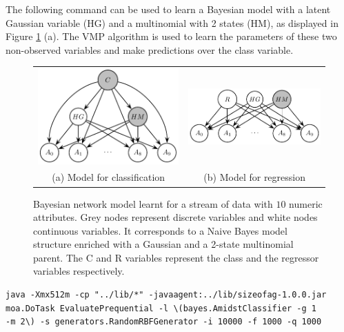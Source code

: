 The following command can be used to learn a Bayesian model with a latent Gaussian variable (HG) and a multinomial with 2 states (HM), as displayed in Figure \ref{fig:HODE} (a). The VMP algorithm is used to learn the parameters of these two non-observed variables and make predictions over the class variable.

\begin{figure}[htb]
   \centering
   \begin{tabular}{cc}
	\includegraphics[scale=0.8]{figs/HODE}&
	\includegraphics[scale=0.8]{figs/regressionHODE}\\
	(a) Model for classification & (b) Model for regression \\
	\end{tabular}
\caption{Bayesian network model learnt for a stream of data with $10$ numeric attributes. Grey nodes represent discrete variables and white nodes continuous variables. It corresponds to a Naive Bayes model structure enriched with a Gaussian and a 2-state multinomial parent. The C and R variables represent the class and the regressor variables respectively.}
\label{fig:HODE}
\end{figure}

\begin{verbatim}
java -Xmx512m -cp "../lib/*" -javaagent:../lib/sizeofag-1.0.0.jar 
moa.DoTask EvaluatePrequential -l \(bayes.AmidstClassifier -g 1 
-m 2\) -s generators.RandomRBFGenerator -i 10000 -f 1000 -q 1000
\end{verbatim}

